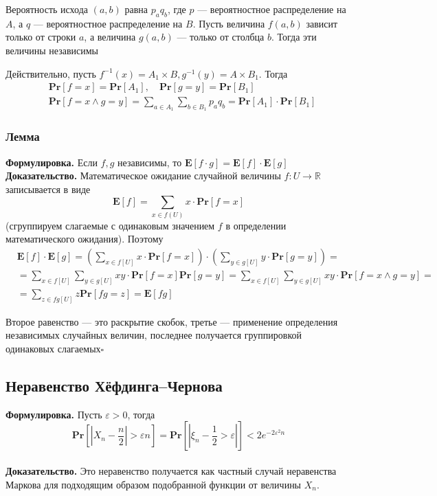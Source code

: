 \documentclass[a4paper]{article}
\newcommand{\qed}{\hfill$\square$}
\newcommand{\pr}[1]{\textbf{Pr}\left[#1\right]}
\begin{document}
Вероятность исхода $(a, b)$ равна $p_a q_b$, где $p$ — вероятностное распределение на $A$, а $q$ — вероятностное распределение на $B$. Пусть величина $f(a, b)$ зависит только от строки $a$, а величина $g(a, b)$ — только от столбца $b$. Тогда эти величины независимы

Действительно, пусть $f^{-1}(x)=A_1 \times B, g^{-1}(y)=A \times B_1$. Тогда
$$
\begin{aligned}
& \textbf{Pr}[f=x]=\textbf{Pr}\left[A_1\right], \quad \textbf{Pr}[g=y]=\textbf{Pr}\left[B_1\right] \\
& \textbf{Pr}[f=x \wedge g=y]=\sum_{a \in A_1} \sum_{b \in B_1} p_a q_b=\textbf{Pr}\left[A_1\right] \cdot \textbf{Pr}\left[B_1\right]
\end{aligned}
$$

\subsubsection*{Лемма}
\textbf{Формулировка.} Если $f, g$ независимы, то $\textbf{E}[f\cdot g] = \textbf{E}[f]\cdot \textbf{E}[g]$\\[4mm]
\indent\textbf{Доказательство.} Математическое ожидание случайной величины $f: U \rightarrow \mathbb{R}$ записывается в виде
$$
\mathbf{E}[f]=\sum_{x \in f(U)} x \cdot \textbf{Pr}[f=x]
$$
(сгруппируем слагаемые с одинаковым значением $f$ в определении математического ожидания). Поэтому
$$
\begin{aligned}
& \mathbf{E}[f] \cdot \mathbf{E}[g]=\left(\sum_{x \in f[U]} x \cdot \textbf{Pr}[f=x]\right) \cdot\left(\sum_{y \in g[U]} y \cdot \textbf{Pr}[g=y]\right)= \\
& =\sum_{x \in f[U]} \sum_{y \in g[U]} x y \cdot \textbf{Pr}[f=x] \mathbf{P r}[g=y]=\sum_{x \in f[U]} \sum_{y \in g[U]} x y \cdot \textbf{Pr}[f=x \wedge g=y]= \\
& =\sum_{z \in f g[U]} z \textbf{Pr}[f g=z]=\mathbf{E}[f g]
\end{aligned}
$$

Второе равенство — это раскрытие скобок, третье — применение определения независимых случайных величин, последнее получается группировкой одинаковых слагаемых\qed

\subsection{Неравенство Хёфдинга–Чернова}
\textbf{Формулировка.} Пусть $\varepsilon>0$, тогда
$$\pr{\left|X_n-\frac{n}{2}\right|>\varepsilon n}=\pr{\left|\xi_n-\frac{1}{2}>\varepsilon\right|}<2e^{-2\varepsilon^2n}$$\\[4mm]
\indent\textbf{Доказательство.} Это неравенство получается как частный случай неравенства Маркова для подходящим образом подобранной функции от величины $X_{n}$.
\end{document}
